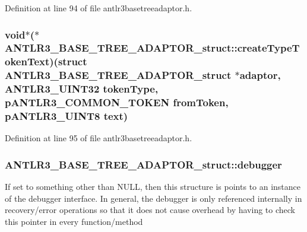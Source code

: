 Definition at line 94 of file antlr3basetreeadaptor.\-h.

\hypertarget{struct_a_n_t_l_r3___b_a_s_e___t_r_e_e___a_d_a_p_t_o_r__struct_a63f538d18902231cbfc7eb48f0697c64}{
\subsubsection[{create\-Type\-Token\-Text}]{\setlength{\rightskip}{0pt plus 5cm}void$\ast$($\ast$ A\-N\-T\-L\-R3\-\_\-\-B\-A\-S\-E\-\_\-\-T\-R\-E\-E\-\_\-\-A\-D\-A\-P\-T\-O\-R\-\_\-struct\-::create\-Type\-Token\-Text)(struct {\bf A\-N\-T\-L\-R3\-\_\-\-B\-A\-S\-E\-\_\-\-T\-R\-E\-E\-\_\-\-A\-D\-A\-P\-T\-O\-R\-\_\-struct} $\ast$adaptor, {\bf A\-N\-T\-L\-R3\-\_\-\-U\-I\-N\-T32} token\-Type, {\bf p\-A\-N\-T\-L\-R3\-\_\-\-C\-O\-M\-M\-O\-N\-\_\-\-T\-O\-K\-E\-N} from\-Token, {\bf p\-A\-N\-T\-L\-R3\-\_\-\-U\-I\-N\-T8} text)}}\label{struct_a_n_t_l_r3___b_a_s_e___t_r_e_e___a_d_a_p_t_o_r__struct_a63f538d18902231cbfc7eb48f0697c64}


Definition at line 95 of file antlr3basetreeadaptor.\-h.

\hypertarget{struct_a_n_t_l_r3___b_a_s_e___t_r_e_e___a_d_a_p_t_o_r__struct_af2d558faa308c0d544780b9a666b0728}{
\subsubsection[{debugger}]{ A\-N\-T\-L\-R3\-\_\-\-B\-A\-S\-E\-\_\-\-T\-R\-E\-E\-\_\-\-A\-D\-A\-P\-T\-O\-R\-\_\-struct\-::debugger}}\label{struct_a_n_t_l_r3___b_a_s_e___t_r_e_e___a_d_a_p_t_o_r__struct_af2d558faa308c0d544780b9a666b0728}
If set to something other than N\-U\-L\-L, then this structure is points to an instance of the debugger interface. In general, the debugger is only referenced internally in recovery/error operations so that it does not cause overhead by having to check this pointer in every function/method 

